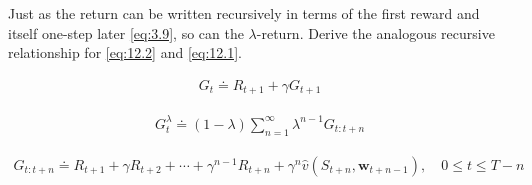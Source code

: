 
\begin{exercise}[Exercise 12.1]

Just as the return can be written recursively in terms of the first reward and itself one-step later \eqref{eq:3.9}, so can the $\lambda$-return.
Derive the analogous recursive relationship for \eqref{eq:12.2} and \eqref{eq:12.1}.

\end{exercise}


\begin{solution}

\begin{align} \label{eq:3.9} \tag{3.9}
    G_t
    \doteq
    R_{t+1} + \gamma G_{t+1}
\end{align}

\begin{align} \label{eq:12.2} \tag{12.2}
    G_t^\lambda
    \doteq
    (1 - \lambda)
    \sum_{n=1}^\infty
        \lambda^{n-1}
        G_{t:t+n}
\end{align}

\begin{align} \label{eq:12.1} \tag{12.1}
    G_{t:t+n}
    \doteq
    R_{t+1} + \gamma R_{t+2} + \cdots + \gamma^{n-1} R_{t+n} + \gamma^n \hat v(S_{t+n}, \mathbf w_{t+n-1}),
    \quad
    0 \leq t \leq T - n
\end{align}

\end{solution}

